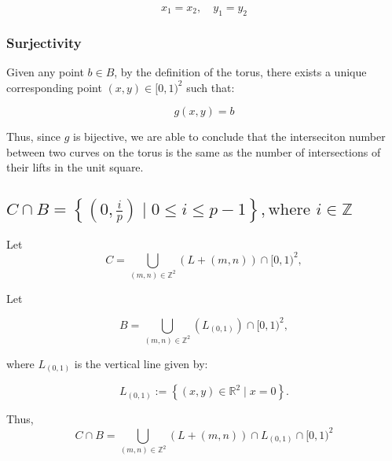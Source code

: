 \documentclass[11pt]{article}
\begin{document}
\[
x_1 = x_2, \quad y_1 = y_2
\]


\subsubsection{Surjectivity}
\label{sec:org18295de}
Given any point \(b \in B\), by the definition of the torus, there exists a unique corresponding point \((x, y) \in [0,1)^2\) such that:

\[
g(x, y) = b
\]

Thus, since \(g\) is bijective, we are able to conclude that the interseciton number between two curves on the torus is the same as the number of intersections of their lifts in the unit square. 



\subsection{\(C \cap B = \left\{ \left(0, \frac{i}{p} \right) \mid 0 \leq i \leq p-1 \right\}, \text{where } i \in \mathbb{Z}\)}
\label{sec:org5215c8c}


\noindent
Let 
\[
C = \bigcup_{(m,n) \in \mathbb{Z}^2} \left( L + (m,n) \right) \cap [0,1)^2,
\]



\noindent
Let

\[
B = \bigcup_{(m,n) \in \mathbb{Z}^2} \left( L_{(0,1)} \right) \cap [0,1)^2,
\]

where \(L_{(0,1)}\) is the vertical line given by:

\[
L_{(0,1)} := \left\{ (x,y) \in \mathbb{R}^2 \mid x = 0 \right\}.
\]

Thus,
\[
C \cap B = \bigcup_{(m,n) \in \mathbb{Z}^2} \left( L + (m,n) \right) \cap  L_{(0,1)} \cap  [0,1)^2
\]
\end{document}
